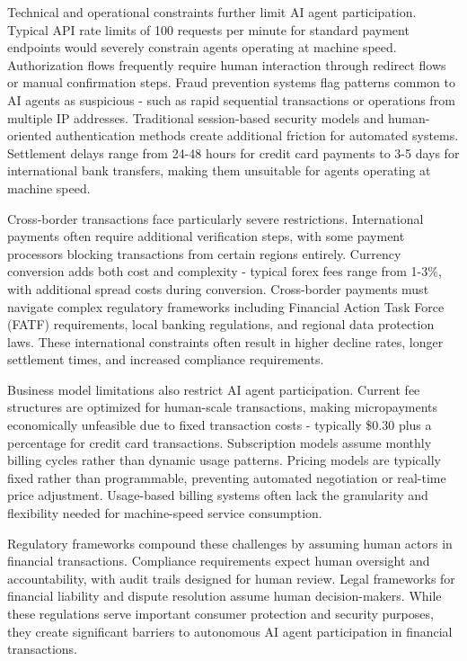 \documentclass{article}
\begin{document}
Technical and operational constraints further limit AI agent participation. Typical API rate limits of 100 requests per minute for standard payment endpoints would severely constrain agents operating at machine speed. Authorization flows frequently require human interaction through redirect flows or manual confirmation steps. Fraud prevention systems flag patterns common to AI agents as suspicious - such as rapid sequential transactions or operations from multiple IP addresses. Traditional session-based security models and human-oriented authentication methods create additional friction for automated systems. Settlement delays range from 24-48 hours for credit card payments to 3-5 days for international bank transfers, making them unsuitable for agents operating at machine speed.

Cross-border transactions face particularly severe restrictions. International payments often require additional verification steps, with some payment processors blocking transactions from certain regions entirely. Currency conversion adds both cost and complexity - typical forex fees range from 1-3\%, with additional spread costs during conversion. Cross-border payments must navigate complex regulatory frameworks including  Financial Action Task Force (FATF) requirements, local banking regulations, and regional data protection laws. These international constraints often result in higher decline rates, longer settlement times, and increased compliance requirements.

Business model limitations also restrict AI agent participation. Current fee structures are optimized for human-scale transactions, making micropayments economically unfeasible due to fixed transaction costs - typically \$0.30 plus a percentage for credit card transactions. Subscription models assume monthly billing cycles rather than dynamic usage patterns. Pricing models are typically fixed rather than programmable, preventing automated negotiation or real-time price adjustment. Usage-based billing systems often lack the granularity and flexibility needed for machine-speed service consumption.

Regulatory frameworks compound these challenges by assuming human actors in financial transactions. Compliance requirements expect human oversight and accountability, with audit trails designed for human review. Legal frameworks for financial liability and dispute resolution assume human decision-makers. While these regulations serve important consumer protection and security purposes, they create significant barriers to autonomous AI agent participation in financial transactions.
\end{document}
